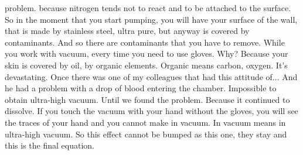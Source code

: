 problem. because nitrogen tends not to react and to be attached to the surface. So in the moment that you start pumping, you will have your surface of the wall, that is made by stainless steel, ultra pure, but anyway is covered by contaminants. And so there are contaminants that you have to remove. While you work with vacuum, every time you need to use gloves. Why? Because your skin is covered by oil, by organic elements. Organic means carbon, oxygen. It's devastating. Once there was one of my colleagues that had this attitude of... And he had a problem with a drop of blood entering the chamber. Impossible to obtain ultra-high vacuum. Until we found the problem. Because it continued to dissolve. If you touch the vacuum with your hand without the gloves, you will see the traces of your hand and you cannot make in vacuum. In vacuum means in ultra-high vacuum. So this effect cannot be bumped as this one, they stay and this is the final equation.
